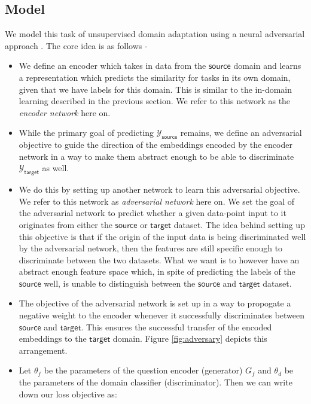 \documentclass{sigkddExp}
\begin{document}
\subsection{Model}
We model this task of unsupervised domain adaptation using a neural adversarial approach \cite{ganin2015unsupervised}. The core idea is as follows - 
\begin{itemize}[topsep=0pt,itemsep=-1ex,partopsep=1ex,parsep=1ex]
    \item We define an encoder which takes in data from the $\mathsf{source}$ domain and learns a representation which predicts the similarity for tasks in its own domain, given that we have labels for this domain. This is similar to the in-domain learning described in the previous section. We refer to this network as the \textit{encoder network} here on.
    \item While the primary goal of predicting $\mathcal{Y}_\mathsf{source}$ remains, we define an adversarial objective to guide the direction of the embeddings encoded by the encoder network in a way to make them abstract enough to be able to discriminate $\mathcal{Y}_\mathsf{target}$ as well.
    \item We do this by setting up another network to learn this adversarial objective. We refer to this network as \textit{adversarial network} here on. We set the goal of the adversarial network to predict whether a given data-point input to it originates from either the $\mathsf{source}$ or $\mathsf{target}$ dataset. The idea behind setting up this objective is that if the origin of the input data is being discriminated well by the adversarial network, then the features are still specific enough to discriminate between the two datasets. What we want is to however have an abstract enough feature space which, in spite of predicting the labels of the $\mathsf{source}$ well, is unable to distinguish between the $\mathsf{source}$ and $\mathsf{target}$ dataset.
    \item The objective of the adversarial network is set up in a way to propogate a negative weight to the encoder whenever it successfully discriminates between $\mathsf{source}$ and $\mathsf{target}$. This ensures the successful transfer of the encoded embeddings to the $\mathsf{target}$ domain. Figure \ref{fig:adversary} depicts this arrangement.
    \item {\color{red} Let $\theta_f$ be the parameters of the question encoder (generator) $G_f$ and $\theta_d$ be the parameters of the domain classifier (discriminator). Then we can write down our loss objective as:
}
\end{itemize}
\end{document}
